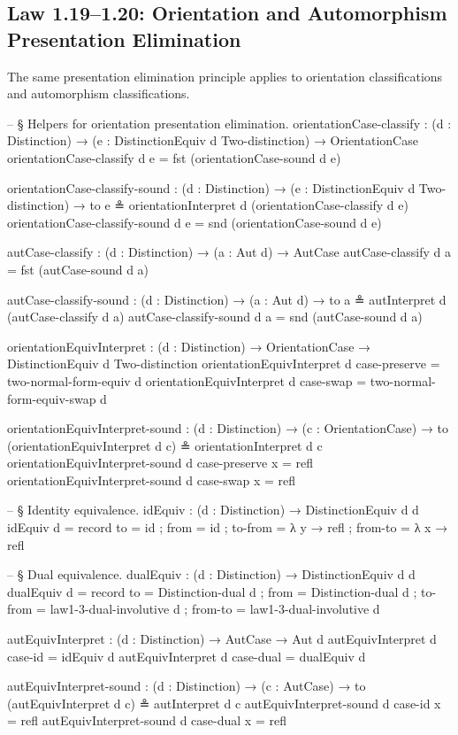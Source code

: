 \documentclass[11pt,a4paper]{book}
\begin{document}
\subsection{Law 1.19--1.20: Orientation and Automorphism Presentation Elimination}

The same presentation elimination principle applies to orientation classifications and automorphism classifications.

\begin{code}
-- § Helpers for orientation presentation elimination.
orientationCase-classify :
  (d : Distinction) →
  (e : DistinctionEquiv d Two-distinction) →
  OrientationCase
orientationCase-classify d e = fst (orientationCase-sound d e)

orientationCase-classify-sound :
  (d : Distinction) →
  (e : DistinctionEquiv d Two-distinction) →
  to e ≗ orientationInterpret d (orientationCase-classify d e)
orientationCase-classify-sound d e = snd (orientationCase-sound d e)

autCase-classify :
  (d : Distinction) →
  (a : Aut d) →
  AutCase
autCase-classify d a = fst (autCase-sound d a)

autCase-classify-sound :
  (d : Distinction) →
  (a : Aut d) →
  to a ≗ autInterpret d (autCase-classify d a)
autCase-classify-sound d a = snd (autCase-sound d a)

orientationEquivInterpret :
  (d : Distinction) →
  OrientationCase →
  DistinctionEquiv d Two-distinction
orientationEquivInterpret d case-preserve = two-normal-form-equiv d
orientationEquivInterpret d case-swap     = two-normal-form-equiv-swap d

orientationEquivInterpret-sound :
  (d : Distinction) →
  (c : OrientationCase) →
  to (orientationEquivInterpret d c) ≗ orientationInterpret d c
orientationEquivInterpret-sound d case-preserve x = refl
orientationEquivInterpret-sound d case-swap     x = refl

-- § Identity equivalence.
idEquiv : (d : Distinction) → DistinctionEquiv d d
idEquiv d = record
  { to      = id
  ; from    = id
  ; to-from = λ y → refl
  ; from-to = λ x → refl
  }

-- § Dual equivalence.
dualEquiv : (d : Distinction) → DistinctionEquiv d d
dualEquiv d = record
  { to      = Distinction-dual d
  ; from    = Distinction-dual d
  ; to-from = law1-3-dual-involutive d
  ; from-to = law1-3-dual-involutive d
  }

autEquivInterpret :
  (d : Distinction) →
  AutCase →
  Aut d
autEquivInterpret d case-id   = idEquiv d
autEquivInterpret d case-dual = dualEquiv d

autEquivInterpret-sound :
  (d : Distinction) →
  (c : AutCase) →
  to (autEquivInterpret d c) ≗ autInterpret d c
autEquivInterpret-sound d case-id   x = refl
autEquivInterpret-sound d case-dual x = refl
\end{code}
\end{document}
